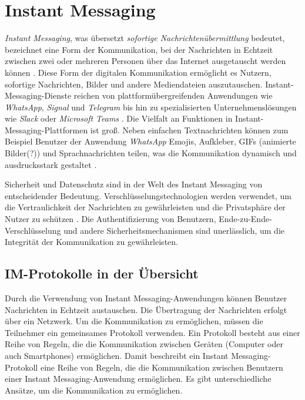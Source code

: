 \section{Instant Messaging}


\textit{Instant Messaging}, was übersetzt \textit{sofortige Nachrichtenübermittlung} bedeutet, bezeichnet eine Form der Kommunikation, bei der Nachrichten in Echtzeit zwischen zwei oder mehreren Personen über das Internet ausgetauscht werden können \Parencite[S. 69]{nist_mobileDeviceForensics}. Diese Form der digitalen Kommunikation ermöglicht es Nutzern, sofortige Nachrichten, Bilder und andere Mediendateien auszutauschen. Instant-Messaging-Dienste reichen von plattformübergreifenden Anwendungen wie \textit{WhatsApp}, \textit{Signal} und \textit{Telegram} bis hin zu spezialisierten Unternehmenslösungen wie \textit{Slack} oder \textit{Microsoft Teams} \parencite{Plett_IMDefinition}. Die Vielfalt an Funktionen in Instant-Messaging-Plattformen ist groß. Neben einfachen Textnachrichten können zum Beispiel Benutzer der Anwendung \textit{WhatsApp} Emojis, Aufkleber, GIFs (animierte Bilder(?)) und Sprachnachrichten teilen, was die Kommunikation dynamisch und ausdrucksstark gestaltet \Parencite{whatsapp_funktionen}.

Sicherheit und Datenschutz sind in der Welt des Instant Messaging von entscheidender Bedeutung. Verschlüsselungstechnologien werden verwendet, um die Vertraulichkeit der Nachrichten zu gewährleisten und die Privatsphäre der Nutzer zu schützen \parencite[S. 13706]{Wang_IMSecurity}. Die Authentifizierung von Benutzern, Ende-zu-Ende-Verschlüsselung und andere Sicherheitsmechanismen sind unerlässlich, um die Integrität der Kommunikation zu gewährleisten.


\subsection{IM-Protokolle in der Übersicht}

Durch die Verwendung von Instant Messaging-Anwendungen können Benutzer Nachrichten in Echtzeit austauschen. Die Übertragung der Nachrichten erfolgt über ein Netzwerk. Um die Kommunikation zu ermöglichen, müssen die Teilnehmer ein gemeinsames Protokoll verwenden. Ein Protokoll besteht aus einer Reihe von Regeln, die die Kommunikation zwischen Geräten (Computer oder auch Smartphones) ermöglichen. Damit beschreibt ein Instant Messaging-Protokoll eine Reihe von Regeln, die die Kommunikation zwischen Benutzern einer Instant Messaging-Anwendung ermöglichen. Es gibt unterschiedliche Ansätze, um die Kommunikation zu ermöglichen. 


